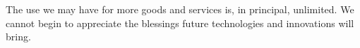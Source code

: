 The use we may have for more goods and services is, in principal, unlimited.
We cannot begin to appreciate the blessings future technologies and innovations will bring.